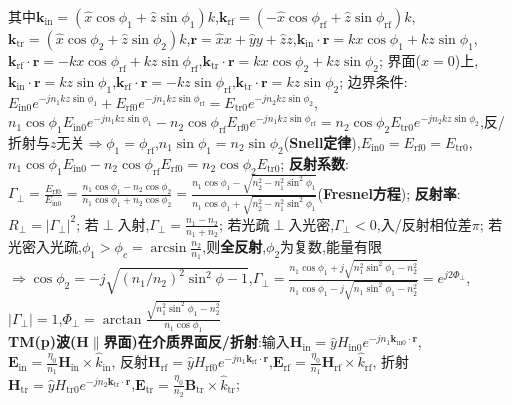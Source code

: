 \documentclass[a4paper,10pt]{article}
\providecommand{\abs}[1]{\lvert#1\rvert}
\begin{document}
\begin{multicols*}{2}
    其中$\bm{k}_{\text{in}}=(\hat{x}\cos\phi_1+\hat{z}\sin\phi_1)k$,$\bm{k}_{\text{rf}}=(-\hat{x}\cos\phi_{\text{rf}}+\hat{z}\sin\phi_{\text{rf}})k$,$\bm{k}_{\text{tr}}=(\hat{x}\cos\phi_2+\hat{z}\sin\phi_2)k$,$\bm{r}=\hat{x}x+\hat{y}y+\hat{z}z$,$\bm{k}_{\text{in}}\cdot\bm{r}=kx\cos\phi_1+kz\sin\phi_1$,$\bm{k}_{\text{rf}}\cdot\bm{r}=-kx\cos\phi_{\text{rf}}+kz\sin\phi_{\text{rf}}$,$\bm{k}_{\text{tr}}\cdot\bm{r}=kx\cos\phi_2+kz\sin\phi_2$;%
    界面($x=0$)上,$\bm{k}_{\text{in}}\cdot\bm{r}=kz\sin\phi_1$,$\bm{k}_{\text{rf}}\cdot\bm{r}=-kz\sin\phi_{\text{rf}}$,$\bm{k}_{\text{tr}}\cdot\bm{r}=kz\sin\phi_2$;%
    边界条件:$E_{\text{in}0}e^{-jn_1kz\sin\phi_1}+E_{\text{rf}0}e^{-jn_1kz\sin\phi_{\text{rf}}}=E_{\text{tr}0}e^{-jn_2kz\sin\phi_2}$,$n_1\cos\phi_1E_{\text{in}0}e^{-jn_1kz\sin\phi_1}-n_2\cos\phi_{\text{rf}}E_{\text{rf}0}e^{-jn_1kz\sin\phi_{\text{rf}}}=n_2\cos\phi_2E_{\text{tr}0}e^{-jn_2kz\sin\phi_2}$,反/折射与$z$无关$\Rightarrow\phi_1=\phi_{\text{rf}}$,$n_1\sin\phi_1=n_2\sin\phi_2$(\textbf{Snell定律}),$E_{\text{in}0}=E_{\text{rf}0}=E_{\text{tr}0}$,$n_1\cos\phi_1E_{\text{in}0}-n_2\cos\phi_{\text{rf}}E_{\text{rf}0}=n_2\cos\phi_2E_{\text{tr}0}$;%
    \textbf{反射系数}:$\Gamma_{\perp}=\frac{E_{\text{rf}0}}{E_{\text{in}0}}=\frac{n_1\cos\phi_1-n_2\cos\phi_2}{n_1\cos\phi_1+n_2\cos\phi_2}=\frac{n_1\cos\phi_1-\sqrt{n_2^2-n_1^2\sin^2\phi_1}}{n_1\cos\phi_1+\sqrt{n_2^2-n_1^2\sin^2\phi_1}}$(\textbf{Fresnel方程});%
    \textbf{反射率}:$R_{\perp}=\abs{\Gamma_{\perp}}^2$;%
    若$\perp$入射,$\Gamma_{\perp}=\frac{n_1-n_2}{n_1+n_2}$;%
    若光疏$\perp$入光密,$\Gamma_{\perp}<0$,入/反射相位差$\pi$;%
    若光密入光疏,$\phi_1>\phi_c=\arcsin\frac{n_2}{n_1}$,则\textbf{全反射},$\phi_2$为复数,能量有限$\Rightarrow\cos\phi_2=-j\sqrt{(n_1/n_2)^2\sin^2\phi-1}$,$\Gamma_{\perp}=\frac{n_1\cos\phi_1+j\sqrt{n_1^2\sin^2\phi_1-n_2^2}}{n_1\cos\phi_1-j\sqrt{n_1\sin^2\phi_1-n_2^2}}=e^{j2\Phi_{\perp}}$,$\abs{\Gamma_{\perp}}=1$,$\Phi_{\perp}=\arctan\frac{\sqrt{n_1^2\sin^2\phi_1-n_2^2}}{n_1\cos\phi_1}$\\%
\textbf{TM(p)波($\bm{H}\parallel$界面)在介质界面反/折射}:输入$\bm{H}_{\text{in}}=\hat{y}H_{\text{in}0}e^{-jn_1\bm{k}_{\text{in}0}\cdot\bm{r}}$,$\bm{E}_{\text{in}}=\frac{\eta_0}{n_1}\bm{H}_{\text{in}}\times\hat{k}_{\text{in}}$,%
    反射$\bm{H}_{\text{rf}}=\hat{y}H_{\text{rf}0}e^{-jn_1\bm{k}_{\text{rf}}\cdot\bm{r}}$,$\bm{E}_{\text{rf}}=\frac{\eta_0}{n_1}\bm{H}_{\text{rf}}\times\hat{k}_{\text{rf}}$,%
    折射$\bm{H}_{\text{tr}}=\hat{y}H_{\text{tr}0}e^{-jn_2\bm{k}_{\text{tr}}\cdot\bm{r}}$,$\bm{E}_{\text{tr}}=\frac{\eta_0}{n_2}\bm{B}_{\text{tr}}\times\hat{k}_{\text{tr}}$;%

\end{multicols*}
\end{document}
